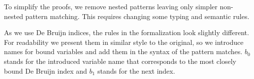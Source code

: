 \documentclass[runningheads]{article}
\begin{document}
\newcommand{\patnat}[1]{#1}
\newcommand{\patapp}[2]{#1\;#2}
\newcommand{\patref}[1]{#1}
\newcommand{\patunlift}[1]{\texttt{unlift}\;#1}
\newcommand{\patbind}[2]{\texttt{bind}[#2]\;#1}
\newcommand{\patlam}[2]{\texttt{lam}[#2]\;#1}
\newcommand{\patfix}[1]{\texttt{fix}\;#1}

\newcommand{\patmat}[4]{\patmatSP{#1}{#2}\patmatThen{#3}#4}
\newcommand{\patmatSP}[2]{#1 \sim #2\;?}
\newcommand{\patmatThen}[1]{\;#1\; \| \;}

\newcommand{\lam}[3]{\lambda#1{:}#2.#3}

\newcommand{\strip}[1]{|#1|}


To simplify the proofs, we remove nested patterns leaving only simpler non-nested pattern matching. This requires changing some typing and semantic rules.

As we use De Bruijn indices, the rules in the formalization look slightly different. For readability we present them in similar style to the original, so we introduce names for bound variables and add them in the syntax of the pattern matches. $b_0$ stands for the introduced variable name that corresponds to the most closely bound De Bruijn index and $b_1$ stands for the next index.
\end{document}
